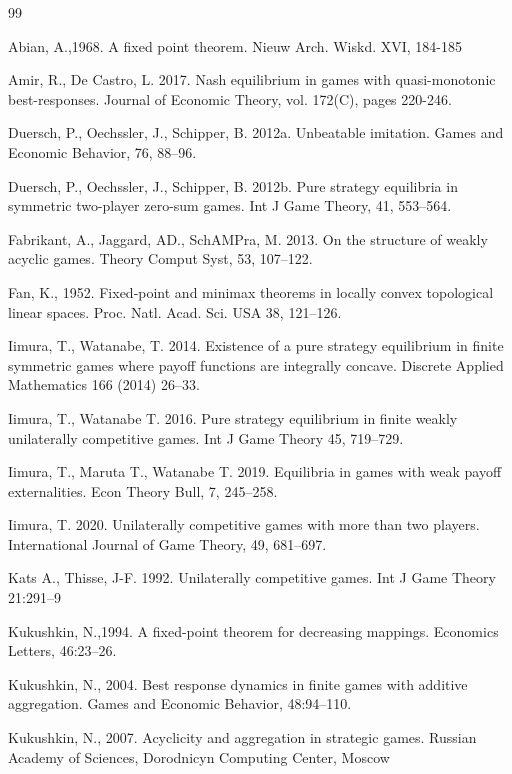 \documentclass[11pt]{article}
\begin{document}
\begin{thebibliography}{99}                                                                                               %


Abian, A.,1968. A fixed point theorem. Nieuw Arch. Wiskd. XVI, 184-185

Amir, R., De Castro, L. 2017. Nash equilibrium in games with
quasi-monotonic best-responses. Journal of Economic Theory, vol. 172(C), pages 220-246.

Duersch, P., Oechssler, J., Schipper, B. 2012a. Unbeatable
imitation. Games and Economic Behavior, 76, 88--96.

Duersch, P., Oechssler, J., Schipper, B. 2012b. Pure strategy
equilibria in symmetric two-player zero-sum games. Int J Game Theory, 41, 553--564.

Fabrikant, A., Jaggard, AD., SchAMPra, M. 2013. On the structure
of weakly acyclic games. Theory Comput Syst, 53, 107--122.

Fan, K., 1952. Fixed-point and minimax theorems in locally
convex topological linear spaces. Proc. Natl. Acad. Sci. USA 38, 121--126.

Iimura, T., Watanabe, T. 2014. Existence of a pure strategy
equilibrium in finite symmetric games where payoff functions are integrally
concave. Discrete Applied Mathematics 166 (2014) 26--33.

Iimura, T., Watanabe T. 2016. Pure strategy equilibrium in
finite weakly unilaterally competitive games. Int J Game Theory 45, 719--729.

Iimura, T., Maruta T., Watanabe T. 2019. Equilibria in games
with weak payoff externalities. Econ Theory Bull, 7, 245--258.

Iimura, T. 2020. Unilaterally competitive games with more than
two players. International Journal of Game Theory, 49, 681--697.

Kats A., Thisse, J-F. 1992. Unilaterally competitive games. Int
J Game Theory 21:291--9

Kukushkin, N.,1994. A fixed-point theorem for decreasing
mappings. Economics Letters, 46:23--26.

Kukushkin, N., 2004. Best response dynamics in finite games with
additive aggregation. Games and Economic Behavior, 48:94--110.

Kukushkin, N., 2007. Acyclicity and aggregation in strategic
games. Russian Academy of Sciences, Dorodnicyn Computing Center, Moscow


\end{thebibliography}
\end{document}

